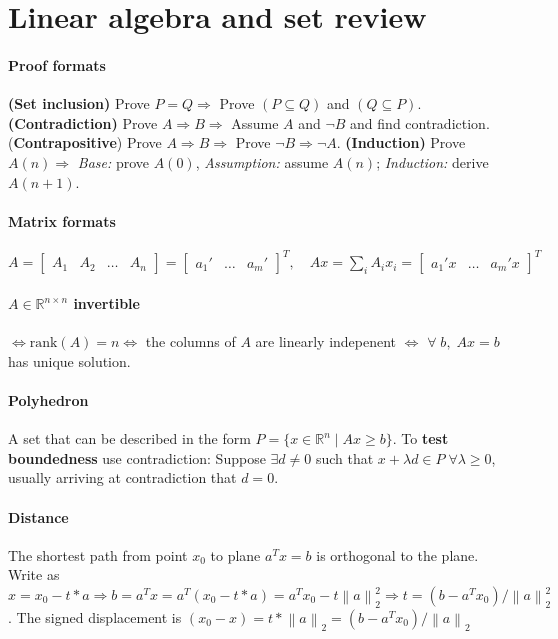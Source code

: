 \documentclass{article}
\newcommand{\norm}[2]{\left\lVert#1\right\rVert_#2}
\begin{document}
\section{Linear algebra and set review}
\paragraph{Proof formats} \textbf{(Set inclusion)} Prove $P = Q \Longrightarrow$ Prove $(P\subseteq Q)$ and $(Q\subseteq P)$. \textbf{(Contradiction)} Prove $A \Rightarrow B \Longrightarrow$ Assume $A$ and $\neg B$ and find contradiction. (\textbf{Contrapositive}) Prove $A \Rightarrow B \Longrightarrow$ Prove $\neg B\Rightarrow \neg A$. \textbf{(Induction)} Prove $A(n) \Longrightarrow$ \emph{Base:} prove $A(0)$, \emph{Assumption:} assume $A(n)$; \emph{Induction:} derive $A(n+1)$.

\paragraph{Matrix formats} $A = \begin{bmatrix}A_1 & A_2& \dots & A_n\end{bmatrix} = 
    \begin{bmatrix} a_1' & \dots & a_m'\end{bmatrix}^T,\quad Ax = \sum_i A_ix_i = 
    \begin{bmatrix} a_1'x & \dots & a_m'x \end{bmatrix}^T$

\paragraph{$A \in \mathbb R^{n\times n}$ invertible} $\iff \text{rank}(A) = n \iff$ the columns of $A$ are linearly indepenent $\iff$ $\forall\;b,\; Ax=b$ has unique solution.


\paragraph{Polyhedron} A set that can be described in the form $P=\{x \in \mathbb R^n \mid Ax \geq b\}$. To \textbf{test boundedness} use contradiction: Suppose $\exists d\neq 0$ such that $x + \lambda d \in P\; \forall \lambda \geq 0$, usually arriving at contradiction that $d=0$. 

\paragraph{Distance} The shortest path from point $x_0$ to plane $a^Tx = b$ is orthogonal to the plane. Write as $x = x_0 - t*a \Longrightarrow b = a^Tx = a^T(x_0 - t*a) = a^Tx_0 - t\norm{a}{2}^2 \Longrightarrow t = (b - a^Tx_0)/\norm{a}{2}^2$. The signed displacement is $(x_0 - x) = t*\norm{a}{2} = (b - a^Tx_0)/\norm{a}{2}$
\end{document}
